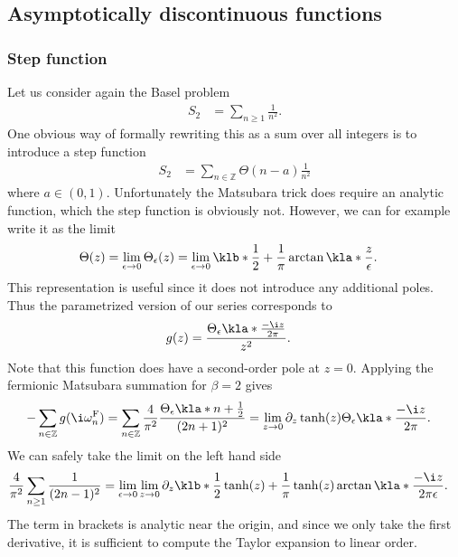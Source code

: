 \documentclass[english, parskip=full]{scrartcl}
\begin{document}
\subsection{Asymptotically discontinuous functions}
\subsubsection{Step function}
Let us consider again the Basel problem
\begin{align}
S_2 &= \sum_{n\ge 1} \frac{1}{n^2}.
\end{align}
One obvious way of formally rewriting this as a sum over all integers is to introduce a step function
\begin{align}
S_2 &= \sum_{n\in\mathbb{Z}} \Theta(n - a) \frac{1}{n^2}
\end{align}
where $a\in (0,1)$.
Unfortunately the Matsubara trick does require an analytic function, which the step function is obviously not.
However, we can for example write it as the limit
\begin{align}
\Theta(z) &= \lim_{\epsilon\rightarrow 0} \Theta_\epsilon(z) = \lim_{\epsilon\rightarrow 0} \klb*{\frac{1}{2} + \frac{1}{\pi} \arctan \kla*{\frac{z}{\epsilon}}}.
\end{align}
This representation is useful since it does not introduce any additional poles.
Thus the parametrized version of our series corresponds to 
\begin{align}
g(z) &= \frac{\Theta_\epsilon\kla*{\frac{-\i z}{2\pi}} }{z^2}.
\end{align}
Note that this function does have a second-order pole at $z=0$.
Applying the fermionic Matsubara summation for $\beta=2$ gives
\begin{align}
-\sum_{n\in\mathbb{Z}} g(\i\omega_n^\text{F}) &= \sum_{n\in\mathbb{Z}} \frac{4}{\pi^2} \frac{\Theta_\epsilon \kla*{n + \frac{1}{2}} }{(2n+1)^2} =  \lim_{z\rightarrow 0} \partial_z \tanh(z) \Theta_\epsilon\kla*{\frac{-\i z}{2\pi}}.
\end{align}
We can safely take the limit on the left hand side 
\begin{align}
\frac{4}{\pi^2}\sum_{n\ge 1} \frac{1}{(2n - 1)^2} &= \lim_{\epsilon \rightarrow 0} \lim_{z\rightarrow 0} \partial_z \klb*{\frac{1}{2} \tanh(z) + \frac{1}{\pi} \tanh(z) \arctan\kla*{\frac{-\i z}{2\pi\epsilon}}  }.
\end{align}
The term in brackets is analytic near the origin, and since we only take the first derivative, it is sufficient to compute the Taylor expansion to linear order.
\end{document}
